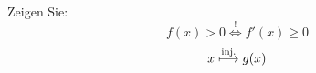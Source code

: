 Zeigen Sie:
\[ f(x) > 0 \stackrel{!}{\iff} f'(x) \geq 0 \]
\[ x \stackrel{\mbox{\scriptsize inj.}}{\longmapsto} g(x) \]
